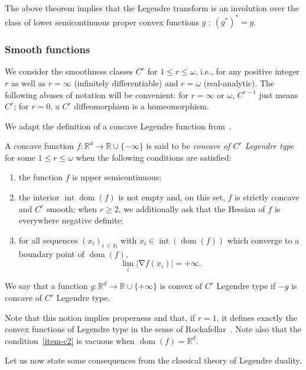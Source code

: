 \documentclass[AHL, Unicode, longabstracts,published]{cedram}
\theoremstyle{plain}
\theoremstyle{plain}
\newcommand\dom{\operatorname{dom}}
\newcommand\inter{\operatorname{int}}
\newcommand{\grad}{\operatorname{\nabla}}
\newcommand*\8{\infty}
\newcommand\NN{\mathbb{N}}
\newcommand\RR{\mathbb{R}}
\newcommand*{\romanenumi}{\renewcommand*{\theenumi}{\roman{enumi}}}
\begin{document}
The above theorem implies that the Legendre transform is an involution over the class of lower semicontinuous proper convex functions $g$ : $(g^*)^*=g$.


\subsubsection*{Smooth functions} 
We consider the smoothness classes $C^r$ for $1\leq r\leq\omega$, i.e., for any positive integer $r$ as well as $r=\infty$ (infinitely differentiable) and $r=\omega$ (real-analytic). The following abuses of notation will be convenient: for $r=\infty$ or $\omega$, $C^{r-1}$ just means $C^r$; for $r=0$, a $C^r$ diffeomorphism is a homeomorphism.

We adapt the definition of a concave Legendre function from~\cite[Chapitre~23]{Rockafellar-book}.

\begin{defi}\label{defi-Legendre}
A concave function $f:\RR^d\to\RR\cup\{-\infty\}$ is said to be \emph{concave of $C^r$ Legendre type} for some $1\leq r\leq\omega$ when the following conditions are satisfied:
\begin{enumerate}\romanenumi
\item\label{item-c0}
the function $f$ is upper semicontinuous;
\item\label{item-c1}
the interior $\inter\dom(f)$ is not empty and, on this set, $f$ is strictly concave and $C^r$ smooth; when $r\geq2$, we additionally ask that the Hessian of $f$ is everywhere negative definite;
\item\label{item-c2}
for all sequences $(x_i)_{i\,\in\,\NN}$ with $x_i\in\inter(\dom(f))$ which converge to a boundary point of $\dom(f)$,
\[
\lim_i \left\lvert \grad f(x_i) \right\rvert = +\infty.
\]
\end{enumerate}
We say that a function $g:\RR^d\to\RR\cup\{+\infty\}$ is convex of $C^r$ Legendre type if $-g$ is concave of $C^r$ Legendre type.
\end{defi}

Note that this notion implies properness and that, if $r=1$, it defines exactly the convex functions of Legendre type in the sense of Rockafellar~\cite[Chapitre~26]{Rockafellar-book}. Note also that the condition~\eqref{item-c2} is vacuous when $\dom(f)=\RR^d$.


Let us now state some consequences from the classical theory of Legendre duality.
\end{document}
